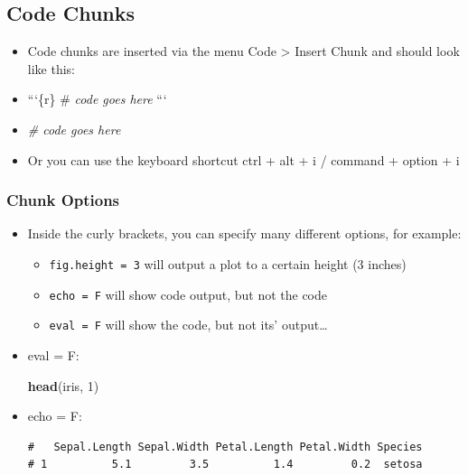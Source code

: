 \documentclass[
]{book}
\newenvironment{Shaded}{\begin{snugshade}}{\end{snugshade}}
\newcommand{\CommentTok}[1]{\textcolor[rgb]{0.56,0.35,0.01}{\textit{#1}}}
\newcommand{\DecValTok}[1]{\textcolor[rgb]{0.00,0.00,0.81}{#1}}
\newcommand{\FunctionTok}[1]{\textcolor[rgb]{0.13,0.29,0.53}{\textbf{#1}}}
\newcommand{\NormalTok}[1]{#1}
\providecommand{\tightlist}{%
  \setlength{\itemsep}{0pt}\setlength{\parskip}{0pt}}
\begin{document}
\subsection{Code Chunks}\label{code-chunks}

\begin{itemize}
\item
  Code chunks are inserted via the menu Code \textgreater{} Insert Chunk and should look like this:
\item
  ```\{r\}
  \# \emph{code goes here}
  ```
\item
\begin{Shaded}
\begin{Highlighting}[]
\CommentTok{\# code goes here}
\end{Highlighting}
\end{Shaded}
\item
  Or you can use the keyboard shortcut ctrl + alt + i / command + option + i
\end{itemize}

\subsubsection*{Chunk Options}\label{chunk-options}

\begin{itemize}
\item
  Inside the curly brackets, you can specify many different options, for example:

  \begin{itemize}
  \tightlist
  \item
    \texttt{fig.height\ =\ 3} will output a plot to a certain height (3 inches)
  \item
    \texttt{echo\ =\ F} will show code output, but not the code
  \item
    \texttt{eval\ =\ F} will show the code, but not its' output\ldots{}
  \end{itemize}
\item
  eval = F:

\begin{Shaded}
\begin{Highlighting}[]
\FunctionTok{head}\NormalTok{(iris, }\DecValTok{1}\NormalTok{) }
\end{Highlighting}
\end{Shaded}
\item
  echo = F:

\begin{verbatim}
#   Sepal.Length Sepal.Width Petal.Length Petal.Width Species
# 1          5.1         3.5          1.4         0.2  setosa
\end{verbatim}
\end{itemize}
\end{document}
